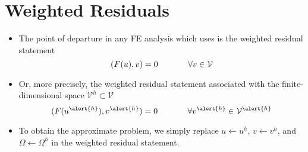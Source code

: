 \section{Weighted Residuals}


\begin{frame}[<+->]
  \begin{itemize}
  \item {The point of departure in any FE analysis which uses \libMesh{} is
    the weighted residual statement
    \begin{equation}
      \nonumber
      (F( u ), v) = 0 \hspace{.5in} \forall v \in \mathcal{V}
    \end{equation}
    }

  \item{ Or, more precisely, the weighted residual statement associated with the
    finite-dimensional space $\mathcal{V}^h \subset \mathcal{V}$
    \begin{equation}
      \nonumber
      (F( u^{\alert{h}} ), v^{\alert{h}}) = 0 \hspace{.5in} \forall v^{\alert{h}} \in \mathcal{V}^{\alert{h}}
  \end{equation}}

  \end{itemize}
\end{frame}





\begin{frame}%
  \begin{itemize}




  \item{To obtain the approximate problem, we simply
    replace $u \leftarrow u^h$, $v \leftarrow v^h$, and $\Omega \leftarrow \Omega^h$
    in the weighted residual
    statement.}
    
  \end{itemize}
\end{frame}

